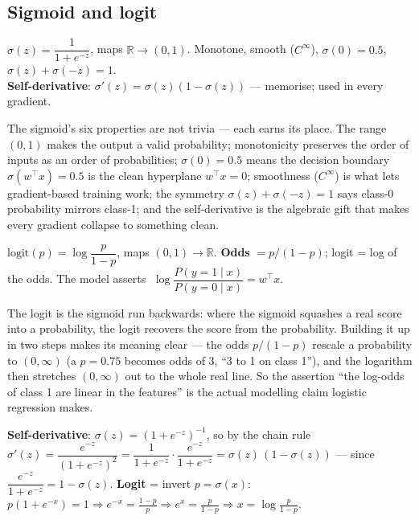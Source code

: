 \documentclass[11pt, a4paper]{article}
\newcommand{\kw}[1]{\textbf{#1}}
\begin{document}
\subsection{Sigmoid and logit}

\begin{defbox}
$\sigma(z)=\dfrac{1}{1+e^{-z}}$, maps $\mathbb R\to(0,1)$. Monotone, smooth ($C^\infty$),
$\sigma(0)=0.5$, $\sigma(z)+\sigma(-z)=1$. \\
\kw{Self-derivative}: $\sigma'(z)=\sigma(z)(1-\sigma(z))$ — memorise; used in every gradient.
\end{defbox}

The sigmoid's six properties are not trivia — each earns its place. The range $(0,1)$ makes the
output a valid probability; monotonicity preserves the order of inputs as an order of
probabilities; $\sigma(0)=0.5$ means the decision boundary $\sigma(w^\top x)=0.5$ is the clean
hyperplane $w^\top x=0$; smoothness ($C^\infty$) is what lets gradient-based training work;
the symmetry $\sigma(z)+\sigma(-z)=1$ says class-0 probability mirrors class-1; and the
self-derivative is the algebraic gift that makes every gradient collapse to something clean.

\begin{defbox}
$\text{logit}(p)=\log\dfrac{p}{1-p}$, maps $(0,1)\to\mathbb R$. \kw{Odds} $=p/(1-p)$; logit = log of
the odds. The model asserts $\;\log\dfrac{P(y{=}1\mid x)}{P(y{=}0\mid x)}=w^\top x$.
\end{defbox}

The logit is the sigmoid run backwards: where the sigmoid squashes a real score into a probability,
the logit recovers the score from the probability. Building it up in two steps makes its meaning
clear — the odds $p/(1-p)$ rescale a probability to $(0,\infty)$ (a $p=0.75$ becomes odds of 3,
``3 to 1 on class 1''), and the logarithm then stretches $(0,\infty)$ out to the whole real line.
So the assertion ``the log-odds of class 1 are linear in the features'' is the actual modelling
claim logistic regression makes.

\begin{exbox}
\kw{Self-derivative}: $\sigma(z)=(1+e^{-z})^{-1}$, so by the chain rule
$\sigma'(z)=\dfrac{e^{-z}}{(1+e^{-z})^2}=\dfrac{1}{1+e^{-z}}\cdot\dfrac{e^{-z}}{1+e^{-z}}
=\sigma(z)\,(1-\sigma(z))$ — since $\dfrac{e^{-z}}{1+e^{-z}}=1-\sigma(z)$.
\kw{Logit} = invert $p=\sigma(x)$: $p(1+e^{-x})=1\Rightarrow e^{-x}=\tfrac{1-p}{p}
\Rightarrow e^{x}=\tfrac{p}{1-p}\Rightarrow x=\log\tfrac{p}{1-p}$.
\end{exbox}
\end{document}
